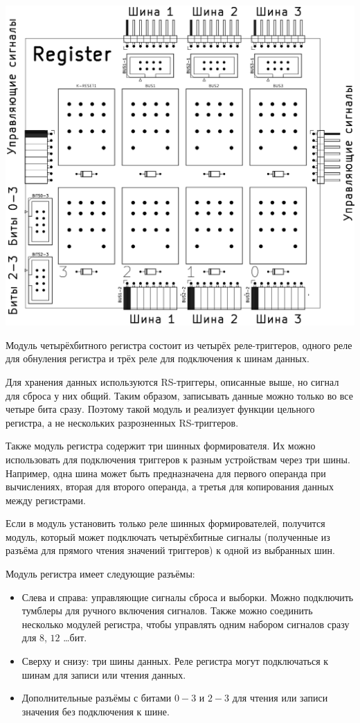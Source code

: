 \begin{center}
\includegraphics{boards/register.png}
\end{center}

Модуль четырёхбитного регистра состоит из четырёх реле-триггеров,
одного реле для обнуления регистра и трёх реле для подключения
к шинам данных.

Для хранения данных используются RS-триггеры, описанные выше,
но сигнал для сброса у них общий. Таким образом, записывать
данные можно только во все четыре бита сразу. Поэтому такой
модуль и реализует функции цельного регистра, а не нескольких
разрозненных RS-триггеров.

Также модуль регистра содержит три шинных формирователя.
Их можно использовать для подключения триггеров к разным устройствам
через три шины. Например, одна шина может быть предназначена
для первого операнда при вычислениях, вторая для второго операнда,
а третья для копирования данных между регистрами.

Если в модуль установить только реле шинных формирователей,
получится модуль, который может подключать четырёхбитные сигналы
(полученные из разъёма для прямого чтения значений триггеров) к одной
из выбранных шин.

Модуль регистра имеет следующие разъёмы:
\begin{itemize}
  \item Слева и справа: управляющие сигналы сброса и выборки.
        Можно подключить тумблеры
        для ручного включения сигналов. Также можно соединить несколько
        модулей регистра, чтобы управлять одним набором сигналов сразу
        для $8$, $12$ \ldots бит.
  \item Сверху и снизу: три шины данных. Реле регистра могут
        подключаться к шинам для записи или чтения данных.
  \item Дополнительные разъёмы с битами $0-3$ и $2-3$ для чтения или
        записи значения без подключения к шине.
\end{itemize}

